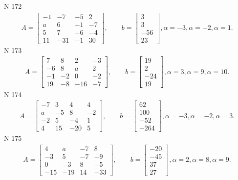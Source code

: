 \documentclass[11pt]{report}
\begin{document}
N 172
\begin{align*}
 A = \left[\begin{matrix}-1 & -7 & -5 & 2\\a & 6 & -1 & -7\\5 & 7 & -6 & -4\\11 & -31 & -1 & 30\end{matrix}\right],
    \qquad b = \left[\begin{matrix}3\\3\\-56\\23\end{matrix}\right], \alpha = -3, \alpha = -2, \alpha = 1. 
 \end{align*}
N 173
\begin{align*}
 A = \left[\begin{matrix}7 & 8 & 2 & -3\\-6 & 8 & a & 2\\-1 & -2 & 0 & -2\\19 & -8 & -16 & -7\end{matrix}\right],
    \qquad b = \left[\begin{matrix}19\\2\\-24\\19\end{matrix}\right], \alpha = 3, \alpha = 9, \alpha = 10. 
 \end{align*}
N 174
\begin{align*}
 A = \left[\begin{matrix}-7 & 3 & 4 & 4\\a & -5 & 8 & -2\\-2 & 5 & -4 & 1\\4 & 15 & -20 & 5\end{matrix}\right],
    \qquad b = \left[\begin{matrix}62\\100\\-52\\-264\end{matrix}\right], \alpha = -3, \alpha = -2, \alpha = 3. 
 \end{align*}
N 175
\begin{align*}
 A = \left[\begin{matrix}4 & a & -7 & 8\\-3 & 5 & -7 & -9\\0 & -3 & 8 & -5\\-15 & -19 & 14 & -33\end{matrix}\right],
    \qquad b = \left[\begin{matrix}-20\\-45\\37\\27\end{matrix}\right], \alpha = 2, \alpha = 8, \alpha = 9. 
 \end{align*}
\end{document}
